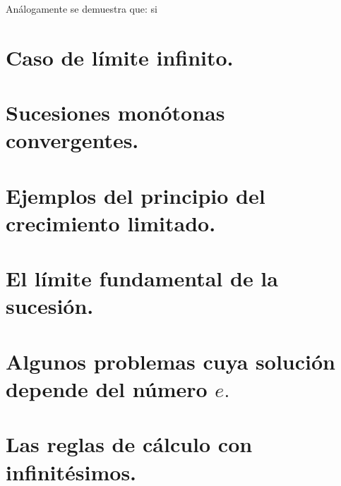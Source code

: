 \documentclass[oneside,english,spanish,2m,twoside,svgnames,x11names,HTML,twoside,12pt]{libro-matua}\usepackage[]{graphicx}\usepackage[]{color}
\begin{document}
Análogamente se demuestra que: si 

\section{Caso de límite infinito.}

\section{Sucesiones monótonas convergentes. }

\section{Ejemplos del principio del crecimiento limitado.}

\section{El límite fundamental de la sucesión.}

\section{Algunos problemas cuya solución depende del número $e.$}

\section{Las reglas de cálculo con infinitésimos. }
\end{document}
